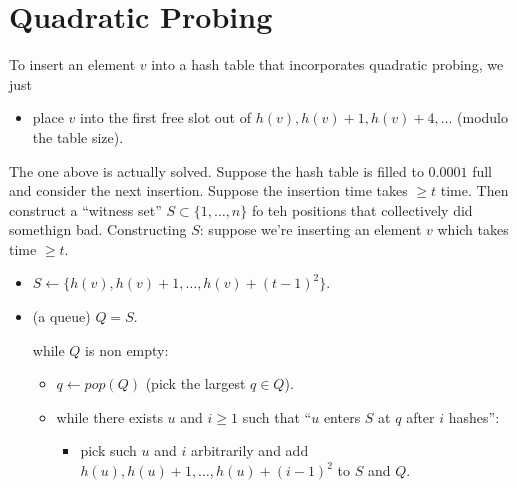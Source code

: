 \documentclass{report}
\begin{document}
\section{Quadratic Probing}
To insert an element $v$ into a hash table that incorporates quadratic probing, we just
\begin{itemize}
    \item place $v$ into the first free slot out of $h(v), h(v) + 1, h(v) + 4, \ldots$ (modulo the table size).
\end{itemize}
The one above is actually solved.
\newpage
\noindent Suppose the hash table is filled to $0.0001$ full and consider the next insertion.
\noindent Suppose the insertion time takes $\geq t$ time. Then construct a ``witness set'' $S \subset \{1, \ldots, n\}$ fo teh positions that collectively did somethign bad.
\noindent Constructing $S$: suppose we're inserting an element $v$ which takes time $\geq t$.
\begin{itemize}
    \item $S \leftarrow \{h(v), h(v) + 1, \ldots, h(v) + (t-1)^2\}$.
    \item (a queue) $Q = S$.
    
    while $Q$ is non empty:
    \begin{itemize}
        \item $q \leftarrow pop(Q)$ (pick the largest $q \in Q$).
        \item while there exists $u$ and $i \geq 1$ such that ``$u$ enters $S$ at $q$ after $i$ hashes'':
        \begin{itemize}
            \item pick such $u$ and $i$ arbitrarily and add $h(u), h(u) + 1, \ldots, h(u) + (i-1)^2$ to $S$ and $Q$.
        \end{itemize}
    \end{itemize}
\end{itemize}
\end{document}
